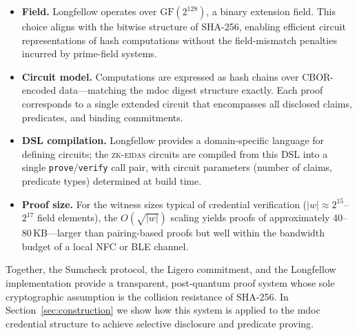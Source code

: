 \begin{itemize}
  \item \textbf{Field.}  Longfellow operates over $\mathrm{GF}(2^{128})$, a
        binary extension field.  This choice aligns with the bitwise structure
        of SHA-256, enabling efficient circuit representations of hash
        computations without the field-mismatch penalties incurred by
        prime-field systems.
  \item \textbf{Circuit model.}  Computations are expressed as hash chains
        over CBOR-encoded data---matching the mdoc digest structure exactly.
        Each proof corresponds to a single extended circuit that encompasses
        all disclosed claims, predicates, and binding commitments.
  \item \textbf{DSL compilation.}  Longfellow provides a domain-specific
        language for defining circuits; the \textsc{zk-eidas} circuits are
        compiled from this DSL into a single \texttt{prove}/\texttt{verify}
        call pair, with circuit parameters (number of claims, predicate types)
        determined at build time.
  \item \textbf{Proof size.}  For the witness sizes typical of credential
        verification ($\lvert w \rvert \approx 2^{15}$--$2^{17}$ field
        elements), the $O(\sqrt{\lvert w \rvert})$ scaling yields proofs of
        approximately 40--80\,KB---larger than pairing-based proofs but well
        within the bandwidth budget of a local NFC or BLE channel.
\end{itemize}

\noindent
Together, the Sumcheck protocol, the Ligero commitment, and the Longfellow
implementation provide a transparent, post-quantum proof system whose sole
cryptographic assumption is the collision resistance of SHA-256.  In
Section~\ref{sec:construction} we show how this system is applied to the mdoc
credential structure to achieve selective disclosure and predicate proving.
